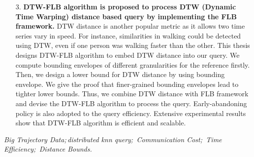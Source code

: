 \begin{itemize}
\item[3.] \textbf{ 	DTW-FLB algorithm is proposed to process DTW (Dynamic Time Warping) distance based query by implementing the FLB framework.} 
DTW distance is another popular metric as it allows two time series vary in speed. For instance, similarities  in walking could be detected using DTW, even if one person was walking faster than the other. This thesis designs DTW-FLB algorithm to embed DTW distance into our query.
We compute  bounding envelopes of different granularities for the reference firstly. Then, we design a lower bound for DTW distance by using bounding envelope. We give the proof that  finer-grained bounding envelopes lead to tighter lower bounds. Thus, we combine DTW distance with FLB framework and devise the DTW-FLB algorithm to process the query. Early-abandoning policy is also adopted to the query efficiency. Extensive experimental results  show that
DTW-FLB  algorithm is efficient and scalable.

\end{itemize}

\hspace{-0.5cm}
{} \textit{Big Trajectory Data;\,distributed knn query;\, Communication Cost;\, Time Efficiency;\, Distance Bounds.
}
































